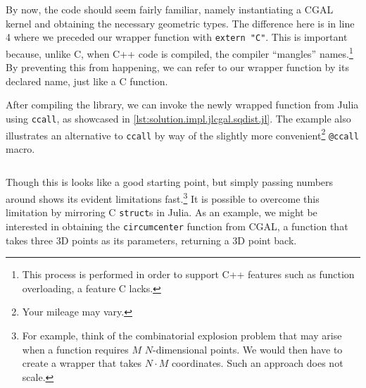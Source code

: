 \begin{listing}[htb]
  \inputminted{cpp}{cpp/sqdist.cpp}
  \caption[C wrapper for squared distance functionality]{
    Example C library code that wraps \ac{CGAL}'s \texttt{squared\_distance}
    global function.  The original function takes in instances of
    \texttt{Point\_3} classes, so we instantiate them from our \texttt{double}
    coordinate inputs.}%
  \label{lst:solution.impl.jlcgal.sqdist.cpp}
\end{listing}

By now, the code should seem fairly familiar, namely instantiating a \ac{CGAL}
kernel and obtaining the necessary geometric types.  The difference here is in
line 4 where we preceded our wrapper function with \texttt{extern "C"}.
This is important because, unlike C, when C++ code is compiled, the compiler
``mangles'' names.\footnote{This process is performed in order to support
C++ features such as function overloading, a feature C lacks.}  By preventing
this from happening, we can refer to our wrapper function by its declared name,
just like a C function.

After compiling the library, we can invoke the newly wrapped function from Julia
using \texttt{ccall}, as showcased in
\cref{lst:solution.impl.jlcgal.sqdist.jl}.  The example also illustrates an
alternative to \texttt{ccall} by way of the slightly more
convenient\footnote{Your mileage may vary.} \texttt{@ccall} macro.

\begin{listing}[htb]
  \inputminted{julia}{jl/sqdist.jl}
  \caption[Julia squared distance example program]{
    Example Julia program that invokes the functionality from the library whose
    source is listed in \cref{lst:solution.impl.jlcgal.sqdist.cpp}.  Julia's
    \texttt{ccall} construct converts the input arguments' types to
    the types specified in the native C function's parameter types.}%
  \label{lst:solution.impl.jlcgal.sqdist.jl}
\end{listing}

Though this is looks like a good starting point, but simply passing numbers
around shows its evident limitations fast.\footnote{For example, think of the
combinatorial explosion problem that may arise when a function requires $M$
$N$-dimensional points.  We would then have to create a wrapper that takes
$N\cdot M$ coordinates.  Such an approach does not scale.} It is possible to
overcome this limitation by mirroring C \texttt{struct}s in Julia.  As an
example, we might be interested in obtaining the \texttt{circumcenter} function
from \ac{CGAL}, a function that takes three 3D points as its parameters,
returning a 3D point back.

